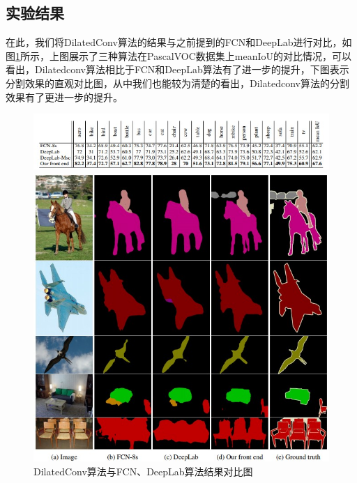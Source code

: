 \documentclass[cn]{elegantbook}
\begin{document}
\subsection{实验结果}
在此，我们将DilatedConv算法的结果与之前提到的FCN和DeepLab进行对比，如图\ref{dilateconv}所示，上图展示了三种算法在PascalVOC数据集上meanIoU的对比情况，可以看出，Dilatedconv算法相比于FCN和DeepLab算法有了进一步的提升，下图表示分割效果的直观对比图，从中我们也能较为清楚的看出，Dilatedconv算法的分割效果有了更进一步的提升。
\begin{figure}[!h]
	\centering
	\begin{minipage}[t]{0.95\textwidth}
		\centering
		\includegraphics[width=\textwidth]{images/dilatedconv2}
	\end{minipage}
	\begin{minipage}[t]{0.95\textwidth}
		\centering
		\includegraphics[width=\textwidth]{images/dilatedconv1}
	\end{minipage}
	\caption{\label{dilateconv}DilatedConv算法与FCN、DeepLab算法结果对比图}
\end{figure}
\end{document}
